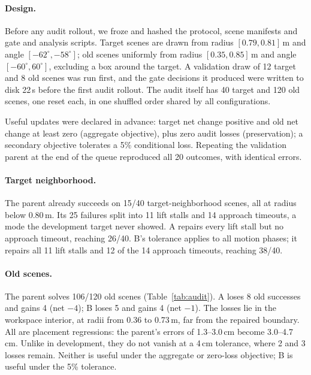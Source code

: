 \documentclass[letterpaper]{article} %
\begin{document}
\paragraph{Design.} Before any audit rollout, we froze and hashed the protocol, scene manifests and gate and analysis scripts. Target scenes are drawn from radius $[0.79, 0.81]$\,m and angle $[-62^\circ, -58^\circ]$; old scenes uniformly from radius $[0.35, 0.85]$\,m and angle $[-60^\circ, 60^\circ]$, excluding a box around the target. A validation draw of 12 target and 8 old scenes was run first, and the gate decisions it produced were written to disk 22\,s before the first audit rollout. The audit itself has 40 target and 120 old scenes, one reset each, in one shuffled order shared by all configurations.

Useful updates were declared in advance: target net change positive and old net change at least zero (aggregate objective), plus zero audit losses (preservation); a secondary objective tolerates a 5\% conditional loss. Repeating the validation parent at the end of the queue reproduced all 20 outcomes, with identical errors.



\paragraph{Target neighborhood.} The parent already succeeds on 15/40 target-neighborhood scenes, all at radius below 0.80\,m. Its 25 failures split into 11 lift stalls and 14 approach timeouts, a mode the development target never showed. A repairs every lift stall but no approach timeout, reaching 26/40. B's tolerance applies to all motion phases; it repairs all 11 lift stalls and 12 of the 14 approach timeouts, reaching 38/40.

\paragraph{Old scenes.} The parent solves 106/120 old scenes (Table~\ref{tab:audit}). A loses 8 old successes and gains 4 (net $-4$); B loses 5 and gains 4 (net $-1$). The losses lie in the workspace interior, at radii from 0.36 to 0.73\,m, far from the repaired boundary. All are placement regressions: the parent's errors of 1.3--3.0\,cm become 3.0--4.7\,cm. Unlike in development, they do not vanish at a 4\,cm tolerance, where 2 and 3 losses remain. Neither is useful under the aggregate or zero-loss objective; B is useful under the 5\% tolerance.
\end{document}
